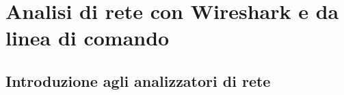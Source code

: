 \documentclass[a4paper]{article}
\begin{document}
	\section{Analisi di rete con Wireshark e da linea di comando}
	
	\subsection{Introduzione agli analizzatori di rete}
	
\end{document}
